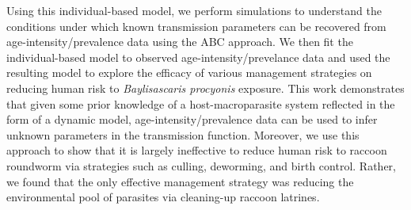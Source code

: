 \documentclass[11pt]{article}
\begin{document}
Using this individual-based model, we perform simulations to understand the conditions under which known transmission parameters can be recovered from age-intensity/prevalence data using the ABC approach.  We then fit the individual-based model to observed age-intensity/prevelance data and used the resulting model to explore the efficacy of various management strategies on reducing human risk to \emph{Baylisascaris procyonis} exposure. This work demonstrates that given some prior knowledge of a host-macroparasite system reflected in the form of a dynamic model, age-intensity/prevalence data can be used to infer unknown parameters in the transmission function. Moreover, we use this approach to show that it is largely ineffective to reduce human risk to raccoon roundworm via strategies such as culling, deworming, and birth control. Rather, we found that the only effective management strategy was reducing the environmental pool of parasites via cleaning-up raccoon latrines. 




\end{document}
